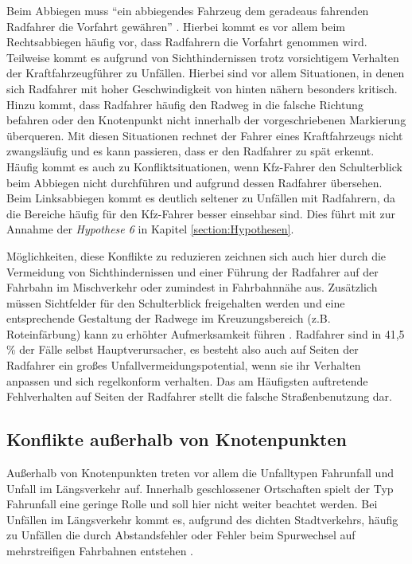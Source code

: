 Beim Abbiegen muss \enquote{ein abbiegendes Fahrzeug dem geradeaus fahrenden Radfahrer die Vorfahrt gewähren} \parencite[S. 303]{Schreiber.2014b}. Hierbei kommt es vor allem beim Rechtsabbiegen häufig vor, dass Radfahrern die Vorfahrt genommen wird. Teilweise kommt es aufgrund von Sichthindernissen trotz vorsichtigem Verhalten der Kraftfahrzeugführer zu Unfällen. Hierbei sind vor allem Situationen, in denen sich Radfahrer mit hoher Geschwindigkeit von hinten nähern besonders kritisch. Hinzu kommt, dass Radfahrer häufig den Radweg in die falsche Richtung befahren oder den Knotenpunkt nicht innerhalb der vorgeschriebenen Markierung überqueren. Mit diesen Situationen rechnet der Fahrer eines Kraftfahrzeugs nicht zwangsläufig und es kann passieren, dass er den Radfahrer zu spät erkennt. Häufig kommt es auch zu Konfliktsituationen, wenn Kfz-Fahrer den Schulterblick beim Abbiegen nicht durchführen und aufgrund dessen Radfahrer übersehen. Beim Linksabbiegen kommt es deutlich seltener zu Unfällen mit Radfahrern, da die Bereiche häufig für den Kfz-Fahrer besser einsehbar sind. Dies führt mit zur Annahme der \textit{Hypothese 6} in Kapitel \ref{section:Hypothesen}.

Möglichkeiten, diese Konflikte zu reduzieren zeichnen sich auch hier durch die Vermeidung von Sichthindernissen und einer Führung der Radfahrer auf der Fahrbahn im Mischverkehr oder zumindest in Fahrbahnnähe aus. Zusätzlich müssen Sichtfelder für den Schulterblick freigehalten werden und eine entsprechende Gestaltung der Radwege im Kreuzungsbereich (z.B. Roteinfärbung) kann zu erhöhter Aufmerksamkeit führen \parencite[S. 309]{Schreiber.2014b}. Radfahrer sind in 41,5 \% \parencite[S. 10]{Below.2016} der Fälle selbst Hauptverursacher, es besteht also auch auf Seiten der Radfahrer ein großes Unfallvermeidungspotential, wenn sie ihr Verhalten anpassen und sich regelkonform verhalten. Das am Häufigsten auftretende Fehlverhalten auf Seiten der Radfahrer stellt die falsche Straßenbenutzung dar.

\subsection{Konflikte außerhalb von Knotenpunkten}
Außerhalb von Knotenpunkten treten vor allem die Unfalltypen Fahrunfall und Unfall im Längsverkehr auf. Innerhalb geschlossener Ortschaften spielt der Typ Fahrunfall eine geringe Rolle und soll hier nicht weiter beachtet werden. Bei Unfällen im Längsverkehr kommt es, aufgrund des dichten Stadtverkehrs, häufig zu Unfällen die durch Abstandsfehler oder Fehler beim Spurwechsel auf mehrstreifigen Fahrbahnen entstehen \parencite[S. 25]{Schmidt.2010}.

